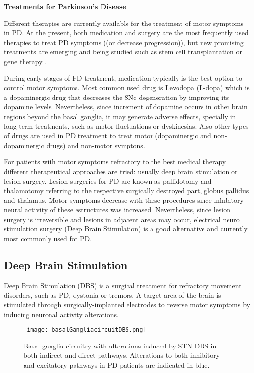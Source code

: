 \textbf{Treatments for Parkinson's Disease}

Different therapies are currently available for the treatment of motor symptoms in PD. At the present, both medication and surgery are the most frequently used therapies to treat PD symptoms ((or decrease progression)), but new promising treatments are emerging and  being studied such as stem cell transplantation or gene therapy \cite{Maiti2017}.

During early stages of PD treatment, medication typically is the best option to control motor symptoms. Most common used drug is Levodopa (L-dopa) which is a dopaminergic drug that decreases the SNc degeneration by improving its dopamine levels. Nevertheless, since increment of dopamine occurs in other brain regions beyond the basal ganglia, it may generate adverse effects, specially in long-term treatments, such as motor fluctuations or dyskinesias. Also other types of drugs are used in PD treatment to treat motor (dopaminergic and non-dopaminergic drugs) and non-motor symptons.

For patients with motor symptoms refractory to the best medical therapy different therapeutical approaches are tried: usually deep brain stimulation or lesion surgery. 
 Lesion surgeries for PD are known as pallidotomy and thalamotomy referring to the respective surgically destroyed part, globus pallidus and thalamus. Motor symptoms decrease with these procedures since inhibitory neural activity of these estructures was increased. Nevertheless, since lesion surgery is irreversible and lesions in adjacent areas may occur, electrical neuro stimulation surgery (Deep Brain Stimulation) is a good alternative and currently most commonly used for PD.
 

\subsection{Deep Brain Stimulation}

Deep Brain Stimulation (DBS) is a surgical treatment for refractory movement disorders, such as PD, dystonia or tremors. A target area of the brain is stimulated through surgically-implanted electrodes to reverse motor symptoms by inducing neuronal activity alterations.

\begin{figure}[!htb]
     \centering    
         \texttt{[image: basalGangliacircuitDBS.png]} 

       \caption{Basal ganglia circuitry with alterations induced by STN-DBS in both indirect and direct pathways. Alterations to both inhibitory and excitatory pathways in PD patients are indicated in blue.}
     \label{fig:basalGangliaDBS}
\end{figure}

